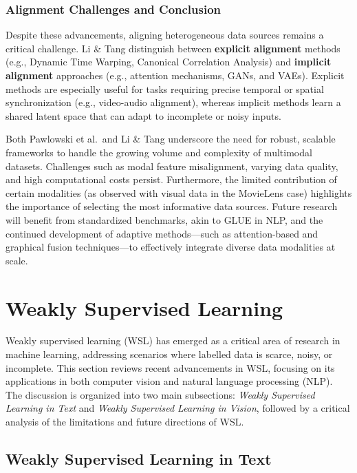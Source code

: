 \subsubsection{Alignment Challenges and Conclusion}
Despite these advancements, aligning heterogeneous data sources remains a critical challenge. Li \& Tang distinguish between \textbf{explicit alignment} methods (e.g., Dynamic Time Warping, Canonical Correlation Analysis) and \textbf{implicit alignment} approaches (e.g., attention mechanisms, GANs, and VAEs). Explicit methods are especially useful for tasks requiring precise temporal or spatial synchronization (e.g., video-audio alignment), whereas implicit methods learn a shared latent space that can adapt to incomplete or noisy inputs.
\newline

Both Pawlowski et al.\ and Li \& Tang underscore the need for robust, scalable frameworks to handle the growing volume and complexity of multimodal datasets. Challenges such as modal feature misalignment, varying data quality, and high computational costs persist. Furthermore, the limited contribution of certain modalities (as observed with visual data in the MovieLens case) highlights the importance of selecting the most informative data sources. Future research will benefit from standardized benchmarks, akin to GLUE in NLP, and the continued development of adaptive methods—such as attention-based and graphical fusion techniques—to effectively integrate diverse data modalities at scale.



\section{Weakly Supervised Learning}
\label{sec:weakly_supervised_back}
Weakly supervised learning (WSL) has emerged as a critical area of research in machine learning, addressing scenarios where labelled data is scarce, noisy, or incomplete. This section reviews recent advancements in WSL, focusing on its applications in both computer vision and natural language processing (NLP). The discussion is organized into two main subsections: \emph{Weakly Supervised Learning in Text} and \emph{Weakly Supervised Learning in Vision}, followed by a critical analysis of the limitations and future directions of WSL.

\subsection{Weakly Supervised Learning in Text}

